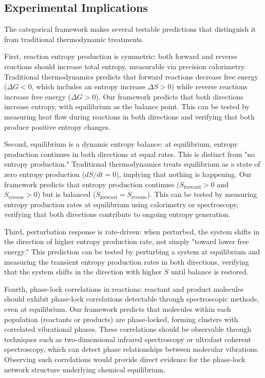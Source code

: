 \documentclass[12pt,a4paper]{article}
\theoremstyle{definition}
\theoremstyle{remark}
\begin{document}
\subsection{Experimental Implications}

The categorical framework makes several testable predictions that distinguish it from traditional thermodynamic treatments.

First, reaction entropy production is symmetric: both forward and reverse reactions should increase total entropy, measurable via precision calorimetry. Traditional thermodynamics predicts that forward reactions decrease free energy ($\Delta G < 0$, which includes an entropy increase $\Delta S > 0$) while reverse reactions increase free energy ($\Delta G > 0$). Our framework predicts that both directions increase entropy, with equilibrium as the balance point. This can be tested by measuring heat flow during reactions in both directions and verifying that both produce positive entropy changes.

Second, equilibrium is a dynamic entropy balance: at equilibrium, entropy production continues in both directions at equal rates. This is distinct from "no entropy production." Traditional thermodynamics treats equilibrium as a state of zero entropy production ($dS/dt = 0$), implying that nothing is happening. Our framework predicts that entropy production continues ($\dot{S}_{\text{forward}} > 0$ and $\dot{S}_{\text{reverse}} > 0$) but is balanced ($\dot{S}_{\text{forward}} = \dot{S}_{\text{reverse}}$). This can be tested by measuring entropy production rates at equilibrium using calorimetry or spectroscopy, verifying that both directions contribute to ongoing entropy generation.

Third, perturbation response is rate-driven: when perturbed, the system shifts in the direction of higher entropy production rate, not simply "toward lower free energy." This prediction can be tested by perturbing a system at equilibrium and measuring the transient entropy production rates in both directions, verifying that the system shifts in the direction with higher $\dot{S}$ until balance is restored.

Fourth, phase-lock correlations in reactions: reactant and product molecules should exhibit phase-lock correlations detectable through spectroscopic methods, even at equilibrium. Our framework predicts that molecules within each population (reactants or products) are phase-locked, forming clusters with correlated vibrational phases. These correlations should be observable through techniques such as two-dimensional infrared spectroscopy or ultrafast coherent spectroscopy, which can detect phase relationships between molecular vibrations. Observing such correlations would provide direct evidence for the phase-lock network structure underlying chemical equilibrium.
\end{document}
